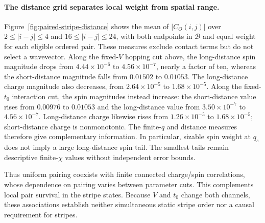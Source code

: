 \documentclass[11pt,letterpaper]{article}
\begin{document}
\paragraph{The distance grid separates local weight from spatial range.}
Figure~\ref{fig:paired-stripe-distance} shows the mean of $|C_O(i,j)|$
over $2\leq|i-j|\leq4$ and $16\leq|i-j|\leq24$, with both endpoints
in $\mathcal B$ and equal weight for each eligible ordered pair.
These measures exclude contact terms but do not select a wavevector.
Along the fixed-$V$ hopping cut above, the long-distance spin magnitude
drops from $4.44\times10^{-6}$ to $4.56\times10^{-7}$, nearly a factor
of ten, whereas the short-distance magnitude falls from $0.01502$ to
$0.01053$. The long-distance charge magnitude also decreases, from
$2.64\times10^{-5}$ to $1.68\times10^{-5}$. Along the fixed-$t_0$
interaction cut, the spin magnitudes instead increase: the short-distance
value rises from $0.00976$ to $0.01053$ and the long-distance value from
$3.50\times10^{-7}$ to $4.56\times10^{-7}$. Long-distance charge likewise
rises from $1.26\times10^{-5}$ to $1.68\times10^{-5}$; short-distance
charge is nonmonotonic. The finite-$q$ and distance measures therefore
give complementary information. In particular, sizable spin weight at
$q_s$ does not imply a large long-distance spin tail. The smallest tails
remain descriptive finite-$\chi$ values without independent error bounds.

Thus uniform pairing coexists with finite connected charge/spin correlations,
whose dependence on pairing varies between parameter cuts. This complements
local pair survival in the stripe states. Because $V$ and $t_0$ change both
channels, these associations establish neither simultaneous static stripe
order nor a causal requirement for stripes.
\end{document}
